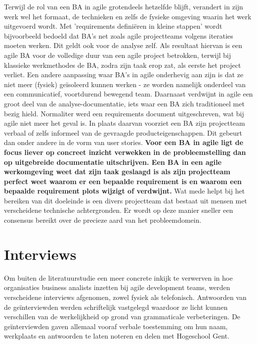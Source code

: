 \documentclass{hogent-article}
\begin{document}
Terwijl de rol van een BA in agile grotendeels hetzelfde blijft, verandert in zijn werk wel 
het formaat, de technieken en zelfs de fysieke omgeving waarin het werk uitgevoerd wordt. 
Met 'requirements definiëren in kleine stappen' wordt bijvoorbeeld bedoeld dat BA's net zoals
agile projectteams volgens iteraties moeten werken. Dit geldt ook voor de analyse zelf.
Als resultaat hiervan is een agile BA voor de volledige duur van een agile project betrokken,
terwijl bij klassieke werkmethodes de BA, zodra zijn taak erop zat, als eerste het project 
verliet. Een andere aanpassing waar BA's in agile onderhevig aan zijn is dat ze niet meer (fysiek)
geïsoleerd kunnen werken - ze worden namelijk onderdeel van een communicatief, voortdurend
bewegend team. Daarnaast verdwijnt in agile een groot deel van de analyse-documentatie, iets waar 
een BA zich traditioneel met bezig hield. Normaliter werd een requirements document uitgeschreven, 
wat bij agile niet meer het geval is. In plaats daarvan voorziet een BA zijn projectteam verbaal 
of zelfs informeel van de gevraagde producteigenschappen. Dit gebeurt dan onder andere in de 
vorm van user stories. \textbf{Voor een BA in agile ligt de focus liever op concreet inzicht 
verwekken in de probleemstelling dan op uitgebreide documentatie uitschrijven. Een BA in een 
agile werkomgeving weet dat zijn taak geslaagd is als zijn projectteam perfect weet waarom 
er een bepaalde requirement is en waarom een bepaalde requirement plots wijzigt of verdwijnt.} Wat mede helpt bij het bereiken van dit doeleinde is een divers 
projectteam dat bestaat uit mensen met verscheidene technische achtergronden. Er wordt op deze
manier sneller een consensus bereikt over de precieze aard van het probleemdomein. \autocite{expertagile}

\section{Interviews}

Om buiten de literatuurstudie een meer concrete inkijk te verwerven in hoe organisaties
business analists inzetten bij agile development teams, werden verscheidene
interviews afgenomen, zowel fysiek als telefonisch. Antwoorden van de geïnterviewden werden 
schriftelijk vastgelegd waardoor ze licht kunnen verschillen van de werkelijkheid op grond
van grammaticale verbeteringen. De geïnterviewden gaven allemaal vooraf verbale 
toestemming om hun naam, werkplaats en antwoorden te laten noteren en delen met Hogeschool Gent. 
\end{document}
